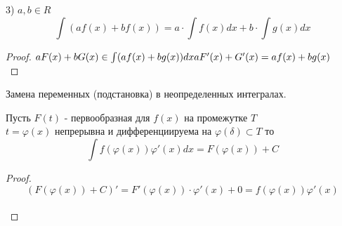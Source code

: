 3) $a, b \in R$\\
\[\int (af(x) + bf(x)) = a \cdot \int f(x)dx + b \cdot \int g(x)dx\]
\begin{proof}
  $aF(x) + bG(x) \in \int (af(x) + bg(x))dx\\
  aF'(x) + G'(x) = af(x) + bg(x)$ \\
\end{proof}

\begin{title}
  Замена переменных (подстановка) в неопределенных интегралах.
\end{title}

\begin{theorem}
  Пусть $F(t)$ - первообразная для $f(x)$ на промежутке $T$ \\
  $t = \varphi (x)$ непрерывна и дифференциируема на $\varphi(\delta) \subset T$
  то\\
  \[\int f(\varphi (x)) \varphi'(x)dx = F(\varphi (x)) + C\]
\end{theorem}

\begin{proof}
  \[(F(\varphi(x)) + C)' = F'(\varphi (x)) \cdot \varphi'(x) + 0 = f(\varphi(x))
  \varphi'(x)\]\\
\end{proof}